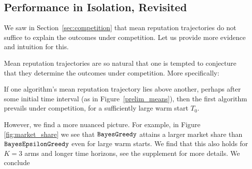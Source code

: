 \documentclass[../competing_bandits_with_appendix.tex]{subfiles}
\begin{document}
\subsection{Performance in Isolation, Revisited}\label{sec:revisited}


We saw in Section~\ref{sec:competition} that mean reputation trajectories do not suffice to explain the outcomes under competition. Let us provide more evidence and intuition for this.

Mean reputation trajectories are so natural that one is tempted to conjecture that they determine the outcomes under competition. More specifically:
\begin{conjecture}\label{conj:mean-trajectories}
If one algorithm's mean reputation trajectory lies above another, perhaps after some initial time interval (\eg as in Figure~\ref{prelim_means}), then the first algorithm prevails under competition, for a sufficiently large warm start $T_0$.
\end{conjecture}

However, we find a more nuanced picture. For example, in Figure \ref{fig:market_share} we see that $\mathtt{BayesGreedy}$ attains a larger market share than $\mathtt{BayesEpsilonGreedy}$ even for large warm starts. We find that this also holds for $K = 3$ arms and longer time horizons, see the supplement for more details. We conclude 
\end{document}
